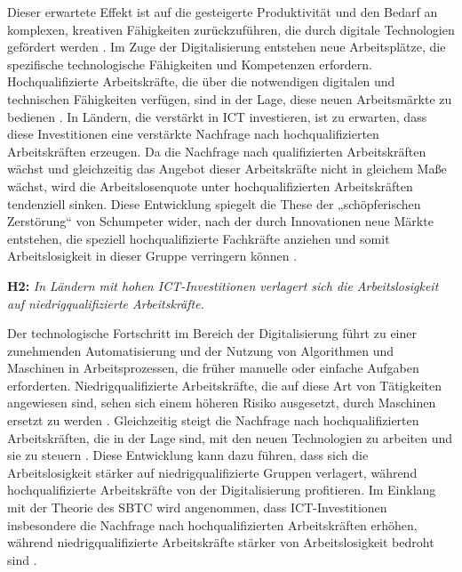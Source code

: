 Dieser erwartete Effekt ist auf die gesteigerte Produktivität und den Bedarf an komplexen, 
kreativen Fähigkeiten zurückzuführen, die durch digitale Technologien gefördert werden 
\parencite[vgl.][S. 1070–1071]{acemoglu2011skills}. Im Zuge der Digitalisierung entstehen neue 
Arbeitsplätze, die spezifische technologische Fähigkeiten und Kompetenzen erfordern. 
Hochqualifizierte Arbeitskräfte, die über die notwendigen digitalen und technischen Fähigkeiten 
verfügen, sind in der Lage, diese neuen Arbeitsmärkte zu bedienen 
\parencite[vgl.][1071]{acemoglu2011skills}. In Ländern, die verstärkt in \ac{ICT} investieren, 
ist zu erwarten, dass diese Investitionen eine verstärkte Nachfrage nach hochqualifizierten 
Arbeitskräften erzeugen. Da die Nachfrage nach qualifizierten Arbeitskräften wächst und 
gleichzeitig das Angebot dieser Arbeitskräfte nicht in gleichem Maße wächst, wird die 
Arbeitslosenquote unter hochqualifizierten Arbeitskräften tendenziell sinken. Diese Entwicklung 
spiegelt die These der „schöpferischen Zerstörung“ von Schumpeter wider, nach der durch 
Innovationen neue Märkte entstehen, die speziell hochqualifizierte Fachkräfte anziehen und somit 
Arbeitslosigkeit in dieser Gruppe verringern können 
\parencite[vgl.][S. 83]{schumpeter1976capitalism}.

\textbf{H2:} \textit{In Ländern mit hohen \ac{ICT}-Investitionen verlagert sich die 
Arbeitslosigkeit auf niedrigqualifizierte Arbeitskräfte.}

Der technologische Fortschritt im Bereich der Digitalisierung führt zu einer zunehmenden 
Automatisierung und der Nutzung von Algorithmen und Maschinen in Arbeitsprozessen, die früher 
manuelle oder einfache Aufgaben erforderten. Niedrigqualifizierte Arbeitskräfte, die auf diese 
Art von Tätigkeiten angewiesen sind, sehen sich einem höheren Risiko ausgesetzt, durch Maschinen 
ersetzt zu werden \parencite[vgl.][S. 9-12]{autor2015whyare}. Gleichzeitig steigt die Nachfrage 
nach hochqualifizierten Arbeitskräften, die in der Lage sind, mit den neuen Technologien zu 
arbeiten und sie zu steuern \parencite[vgl.][S. 12]{autor2015whyare}. Diese Entwicklung kann dazu 
führen, dass sich die Arbeitslosigkeit stärker auf niedrigqualifizierte Gruppen verlagert, 
während hochqualifizierte Arbeitskräfte von der Digitalisierung profitieren. Im Einklang mit der 
Theorie des \ac{SBTC} wird angenommen, dass \ac{ICT}-Investitionen insbesondere die Nachfrage 
nach hochqualifizierten Arbeitskräften erhöhen, während niedrigqualifizierte Arbeitskräfte 
stärker von Arbeitslosigkeit bedroht sind \parencite[vgl.][S. 1070-1072]{acemoglu2011skills}.

